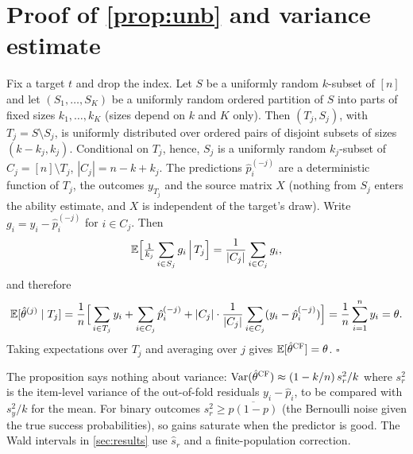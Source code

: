 \section{Proof of \cref{prop:unb} and variance estimate}
\label{app:proof}
Fix a target $t$ and drop the index. Let $S$ be a uniformly random $k$-subset of $[n]$ and let $(S_1,\dots,S_K)$ be a uniformly random ordered partition of $S$ into parts of fixed sizes $k_1,\dots,k_K$ (sizes depend on $k$ and $K$ only). Then $(T_j,S_j)$, with $T_j=S\setminus S_j$, is uniformly distributed over ordered pairs of disjoint subsets of sizes $(k-k_j,k_j)$. Conditional on $T_j$, hence, $S_j$ is a uniformly random $k_j$-subset of $C_j=[n]\setminus T_j$, $|C_j|=n-k+k_j$.
The predictions $\hat p^{(-j)}_i$ are a deterministic function of $T_j$, the outcomes $y_{T_j}$ and the source matrix $X$ (nothing from $S_j$ enters the ability estimate, and $X$ is independent of the target's draw). Write $g_i=y_i-\hat p_i^{(-j)}$ for $i\in C_j$. Then
\[
\mathbb{E}\Big[\tfrac1{k_j}\sum_{i\in S_j}g_i\,\Big|\,T_j\Big]=\frac1{|C_j|}\sum_{i\in C_j}g_i,
\]
and therefore
\[
\mathbb{E}[\hat\theta^{(j)}\mid T_j]=\frac1n\Big[\sum_{i\in T_j}y_i+\sum_{i\in C_j}\hat p_i^{(-j)}+|C_j|\cdot\frac1{|C_j|}\sum_{i\in C_j}(y_i-\hat p_i^{(-j)})\Big]=\frac1n\sum_{i=1}^ny_i=\theta .
\]
Taking expectations over $T_j$ and averaging over $j$ gives $\mathbb{E}[\hat\theta^{\textsc{CF}}]=\theta$. \hfill$\square$

The proposition says nothing about variance: $\mathrm{Var}(\hat\theta^{\textsc{CF}})\approx(1-k/n)\,s_r^2/k$ where $s_r^2$ is the item-level variance of the out-of-fold residuals $y_i-\hat p_i$, to be compared with $s_y^2/k$ for the mean. For binary outcomes $s_r^2\ge\overline{p(1-p)}$ (the Bernoulli noise given the true success probabilities), so gains saturate when the predictor is good. The Wald intervals in \cref{sec:results} use $\hat s_r$ and a finite-population correction.

